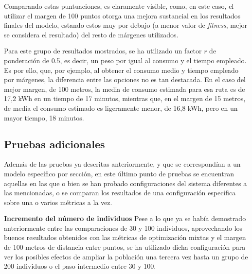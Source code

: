 \documentclass[11pt,spanish,listoffigures,listoftables]{tfgetsinf}
\begin{document}
Comparando estas puntuaciones, es claramente visible, como, en este caso, el utilizar el margen de 100 puntos otorga una mejora sustancial en los resultados finales del modelo, estando estos muy por debajo (a menor valor de \textit{fitness}, mejor se considera el resultado) del resto de márgenes utilizados.

Para este grupo de resultados mostrados, se ha utilizado un factor $r$ de ponderación de 0.5, es decir, un peso por igual al consumo y el tiempo empleado. Es por ello, que, por ejemplo, al obtener el consumo medio y tiempo empleado por márgenes, la diferencia entre las opciones no es tan destacada. En el caso del mejor margen, de 100 metros, la media de consumo estimada para esa ruta es de 17,2 kWh en un tiempo de 17 minutos, mientras que, en el margen de 15 metros, de media el consumo estimado es ligeramente menor, de 16,8 kWh, pero en un mayor tiempo, 18 minutos.

\newpage
\subsection{Pruebas adicionales}
Además de las pruebas ya descritas anteriormente, y que se correspondían a un modelo específico por sección, en este último punto de pruebas se encuentran aquellas en las que o bien se han probado configuraciones del sistema diferentes a las mencionadas, o se comparan los resultados de una configuración específica sobre una o varios métricas a la vez.\newline

\textbf{Incremento del número de individuos}\newline
Pese a lo que ya se había demostrado anteriormente entre las comparaciones de 30 y 100 individuos, aprovechando los buenos resultados obtenidos con las métricas de optimización mixtas y el margen de 100 metros de distancia entre puntos, se ha utilizado dicha configuración para ver los posibles efectos de ampliar la población una tercera vez hasta un grupo de 200 individuos o el paso intermedio entre 30 y 100.
\end{document}
